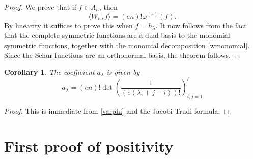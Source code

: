 \documentclass[11pt]{amsart}
\newcommand\la{\lambda}
\newtheorem{lem}[theo]{Lemma}
\newtheorem{cor}[theo]{Corollary}
\theoremstyle{definition}
\numberwithin{equation}{section}
\begin{document}
\begin{proof}
We prove that if $f\in \Lambda_n$, then
\[
\langle W_n , f \rangle = (en)! \varphi^{(e)} (f).
\]
By linearity it suffices to prove this when $f=h_\la$. It now follows from the fact that the complete symmetric functions are a dual basis to the monomial symmetric functions, together with the monomial decomposition \cref{wmonomial}. Since the Schur functions are an orthonormal basis, the theorem follows.
\end{proof}

\begin{cor}
The coefficient $a_\la$ is given
by
\begin{equation}\label{coeffdet}
a_\la=(en)! \det \left( \frac{1}{(e(\la_i+j-i))!} \right)_{i,j=1}^\ell
\end{equation}
\end{cor}

\begin{proof}
This is immediate from \cref{varphi} and the Jacobi-Trudi formula.
\end{proof}




%



\section{First proof of positivity}
\end{document}
